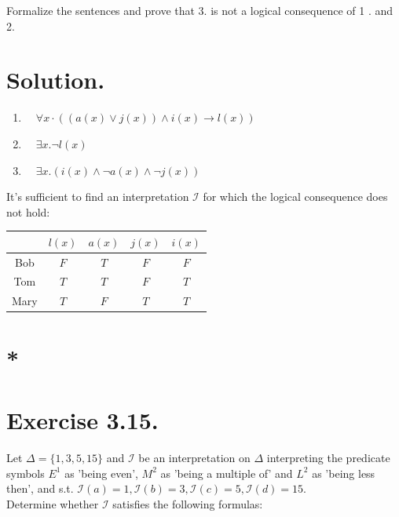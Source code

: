 \documentclass[10pt]{article}
\begin{document}
Formalize the sentences and prove that 3. is not a logical consequence of 1 . and 2.

\section{Solution.}
\begin{enumerate}
  \item $\quad \forall x \cdot((a(x) \vee j(x)) \wedge i(x) \rightarrow l(x))$
  \item $\quad \exists x . \neg l(x)$
  \item $\quad \exists x .(i(x) \wedge \neg a(x) \wedge \neg j(x))$
\end{enumerate}

It's sufficient to find an interpretation $\mathcal{I}$ for which the logical consequence does not hold:

\begin{center}
\begin{tabular}{|c|c|c|c|c|}
\hline
 & $l(x)$ & $a(x)$ & $j(x)$ & $i(x)$ \\
\hline\hline
Bob & $F$ & $T$ & $F$ & $F$ \\
Tom & $T$ & $T$ & $F$ & $T$ \\
Mary & $T$ & $F$ & $T$ & $T$ \\
\hline
\end{tabular}
\end{center}

\section{*}
\section{Exercise 3.15.}
Let $\Delta=\{1,3,5,15\}$ and $\mathcal{I}$ be an interpretation on $\Delta$ interpreting the predicate symbols $E^{1}$ as 'being even', $M^{2}$ as 'being a multiple of' and $L^{2}$ as 'being less then', and s.t. $\mathcal{I}(a)=1, \mathcal{I}(b)=3, \mathcal{I}(c)=5, \mathcal{I}(d)=15$.\\
Determine whether $\mathcal{I}$ satisfies the following formulas:
\end{document}
